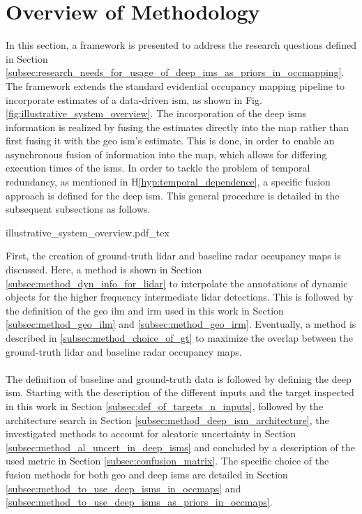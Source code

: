 \section{Overview of Methodology}
\label{sec:framework_overview}
In this section, a framework is presented to address the research questions defined in Section \ref{subsec:research_needs_for_usage_of_deep_ims_as_priors_in_occmapping}. The framework extends the standard evidential occupancy mapping pipeline \cite{pagac1996evidential} to incorporate estimates of a data-driven \gls{ism}, as shown in Fig. \ref{fig:illustrative_system_overview}. The incorporation of the deep \gls{ism}s information is realized by fusing the estimates directly into the map rather than first fusing it with the geo \gls{ism}'s estimate. This is done, in order to enable an asynchronous fusion of information into the map, which allows for differing execution times of the \gls{ism}s. In order to tackle the problem of temporal redundancy, as mentioned in H\ref{hyp:temporal_dependence}, a specific fusion approach is defined for the deep \gls{ism}. This general procedure is detailed in the subsequent subsections as follows.
\begin{center}
	{illustrative_system_overview.pdf_tex}
\end{center}
First, the creation of ground-truth lidar and baseline radar occupancy maps is discussed. Here, a method is shown in Section \ref{subsec:method_dyn_info_for_lidar} to interpolate the annotations of dynamic objects for the higher frequency intermediate lidar detections. This is followed by the definition of the geo \gls{ilm} and \gls{irm} used in this work in Section \ref{subsec:method_geo_ilm} and \ref{subsec:method_geo_irm}. Eventually, a method is described in \ref{subsec:method_choice_of_gt} to maximize the overlap between the ground-truth lidar and baseline radar occupancy maps.
\\\\
The definition of baseline and ground-truth data is followed by defining the deep \gls{ism}. Starting with the description of the different inputs and the target inspected in this work in Section \ref{subsec:def_of_targets_n_inputs}, followed by the architecture search in Section \ref{subsec:method_deep_ism_architecture}, the investigated methods to account for aleatoric uncertainty in Section \ref{subsec:method_al_uncert_in_deep_isms} and concluded by a description of the used metric in Section \ref{subsec:confusion_matrix}. The specific choice of the fusion methods for both geo and deep \gls{ism}s are detailed in Section \ref{subsec:method_to_use_deep_isms_in_occmaps} and \ref{subsec:method_to_use_deep_isms_as_priors_in_occmaps}.
%
